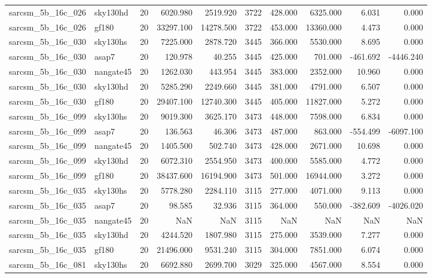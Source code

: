 \begin{tabular}{llrrrrrrrr}
sarcsm\_5b\_16c\_026 & sky130hd & 20 & 6020.980 & 2519.920 & 3722 & 428.000 & 6325.000 & 6.031 & 0.000 \\
sarcsm\_5b\_16c\_026 & gf180 & 20 & 33297.100 & 14278.500 & 3722 & 453.000 & 13360.000 & 4.473 & 0.000 \\
sarcsm\_5b\_16c\_030 & sky130hs & 20 & 7225.000 & 2878.720 & 3445 & 366.000 & 5530.000 & 8.695 & 0.000 \\
sarcsm\_5b\_16c\_030 & asap7 & 20 & 120.978 & 40.255 & 3445 & 425.000 & 701.000 & -461.692 & -4446.240 \\
sarcsm\_5b\_16c\_030 & nangate45 & 20 & 1262.030 & 443.954 & 3445 & 383.000 & 2352.000 & 10.960 & 0.000 \\
sarcsm\_5b\_16c\_030 & sky130hd & 20 & 5285.290 & 2249.660 & 3445 & 381.000 & 4791.000 & 6.507 & 0.000 \\
sarcsm\_5b\_16c\_030 & gf180 & 20 & 29407.100 & 12740.300 & 3445 & 405.000 & 11827.000 & 5.272 & 0.000 \\
sarcsm\_5b\_16c\_099 & sky130hs & 20 & 9019.300 & 3625.170 & 3473 & 448.000 & 7598.000 & 6.834 & 0.000 \\
sarcsm\_5b\_16c\_099 & asap7 & 20 & 136.563 & 46.306 & 3473 & 487.000 & 863.000 & -554.499 & -6097.100 \\
sarcsm\_5b\_16c\_099 & nangate45 & 20 & 1405.500 & 502.740 & 3473 & 428.000 & 2671.000 & 10.698 & 0.000 \\
sarcsm\_5b\_16c\_099 & sky130hd & 20 & 6072.310 & 2554.950 & 3473 & 400.000 & 5585.000 & 4.772 & 0.000 \\
sarcsm\_5b\_16c\_099 & gf180 & 20 & 38437.600 & 16194.900 & 3473 & 501.000 & 16944.000 & 3.272 & 0.000 \\
sarcsm\_5b\_16c\_035 & sky130hs & 20 & 5778.280 & 2284.110 & 3115 & 277.000 & 4071.000 & 9.113 & 0.000 \\
sarcsm\_5b\_16c\_035 & asap7 & 20 & 98.585 & 32.936 & 3115 & 364.000 & 550.000 & -382.609 & -4026.020 \\
sarcsm\_5b\_16c\_035 & nangate45 & 20 & NaN & NaN & 3115 & NaN & NaN & NaN & NaN \\
sarcsm\_5b\_16c\_035 & sky130hd & 20 & 4244.520 & 1807.980 & 3115 & 275.000 & 3539.000 & 7.277 & 0.000 \\
sarcsm\_5b\_16c\_035 & gf180 & 20 & 21496.000 & 9531.240 & 3115 & 304.000 & 7851.000 & 6.074 & 0.000 \\
sarcsm\_5b\_16c\_081 & sky130hs & 20 & 6692.880 & 2699.700 & 3029 & 325.000 & 4567.000 & 8.554 & 0.000 \\

\end{tabular}
